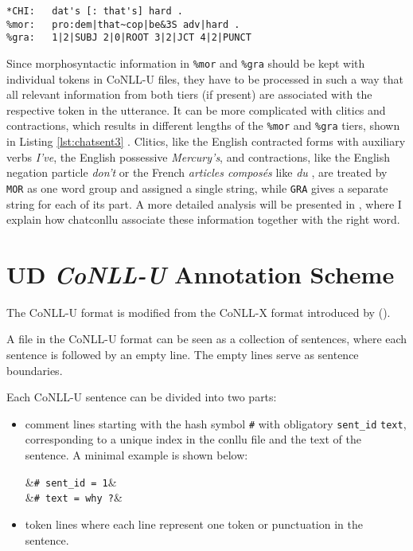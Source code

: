 \lstset{
numbers = none,
frame = single,
}

\begin{lstlisting}[caption={Example to show the different number of strings in \texttt{\%mor} and \texttt{\&gra} tiers due to contracted form \emph{that's}.}, label={lst:chatsent3}]
*CHI:	dat's [: that's] hard .
%mor:	pro:dem|that~cop|be&3S adv|hard .
%gra:	1|2|SUBJ 2|0|ROOT 3|2|JCT 4|2|PUNCT
\end{lstlisting}


Since morphosyntactic information in \texttt{\%mor} and \texttt{\%gra} should be kept with individual tokens in CoNLL-U files, they have to be processed in such a way that all relevant information from both tiers (if present) are associated with the respective token in the utterance. It can be more complicated with clitics and contractions, which results in different lengths of the \texttt{\%mor} and \texttt{\%gra} tiers, shown in Listing \ref{lst:chatsent3} . Clitics, like the English contracted forms with auxiliary verbs \emph{I've}, the English possessive \emph{Mercury's}, and contractions, like the English negation particle \emph{don't} or the French \emph{articles composés} like \emph{du} , are treated by \texttt{MOR} as one word group and assigned a single string, while \texttt{GRA} gives a separate string for each of its part. A more detailed analysis will be presented in , where I explain how chatconllu associate these information together with the right word.

\newcommand{\conllu}[1]{&\footnotesize\texttt{#1}}
\newcommand{\tab}{&\hspace{0.1em}}
\setlength{\abovedisplayskip}{3pt}
\setlength{\belowdisplayskip}{3pt}

\section{UD \emph{CoNLL-U} Annotation Scheme}

The CoNLL-U format is modified from the CoNLL-X format introduced by (\cite{buchholz-marsi-2006-conll}).

A file in the CoNLL-U format can be seen as a collection of sentences, where each sentence is followed by an empty line. The empty lines serve as sentence boundaries.

Each CoNLL-U sentence can be divided into two parts:
\begin{itemize}
	\item comment lines  starting with the hash symbol \texttt{\#} with obligatory \texttt{sent\_id} \texttt{text}, corresponding to a unique index in the conllu file and the text of the sentence. A minimal example is shown below:
	\begin{flalign*}
	\conllu{\# sent\_id = 1}&\\
	\conllu{\# text = why ?}&
	\end{flalign*}
	\item token lines where each line represent one token or punctuation in the sentence.
\end{itemize}
